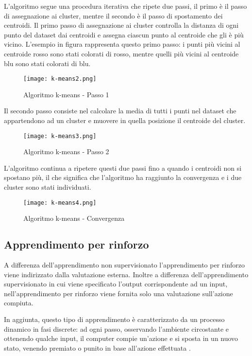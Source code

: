 \documentclass[../main.tex]{subfiles}
\begin{document}
L'algoritmo segue una procedura iterativa che ripete due passi, il primo è il passo di assegnazione ai cluster, mentre il secondo è il passo di spostamento dei centroidi.
Il primo passo di assegnazione ai cluster controlla la distanza di ogni punto del dataset dai centroidi e assegna ciascun punto al centroide che gli è più vicino. 
L'esempio in figura rappresenta questo primo passo: i punti più vicini al centroide rosso sono stati colorati di rosso, mentre quelli più vicini al centroide blu sono stati colorati di blu.

\begin{figure}[H]
				\centering
				\texttt{[image: k-means2.png]}
				\caption{Algoritmo k-means - Passo 1}
\end{figure}

Il secondo passo consiste nel calcolare la media di tutti i punti nel dataset che appartendono ad un cluster e muovere in quella posizione il centroide del cluster.

\begin{figure}[H]
				\centering
				\texttt{[image: k-means3.png]}
				\caption{Algoritmo k-means - Passo 2}
\end{figure}

L'algoritmo continua a ripetere questi due passi fino a quando i centroidi non si spostano più, il che significa che l'algoritmo ha raggiunto la convergenza e i due cluster sono stati individuati.

\begin{figure}[H]
				\centering
				\texttt{[image: k-means4.png]}
				\caption{Algoritmo k-means - Convergenza}
\end{figure}

\subsection{Apprendimento per rinforzo}
A differenza dell'apprendimento non supervisionato l'apprendimento per rinforzo viene indirizzato dalla valutazione esterna. Inoltre a differenza dell'apprendimento supervisionato in cui viene specificato l'output corrispondente ad un input, nell'apprendimento per rinforzo viene fornita solo una valutazione sull'azione compiuta.

In aggiunta, questo tipo di apprendimento è caratterizzato da un processo dinamico in fasi discrete: ad ogni passo, osservando l'ambiente circostante e ottenendo qualche input, il computer compie un'azione e si sposta in un nuovo stato, venendo premiato o punito in base all'azione effettuata \cite{compIntelligence}.
\end{document}
